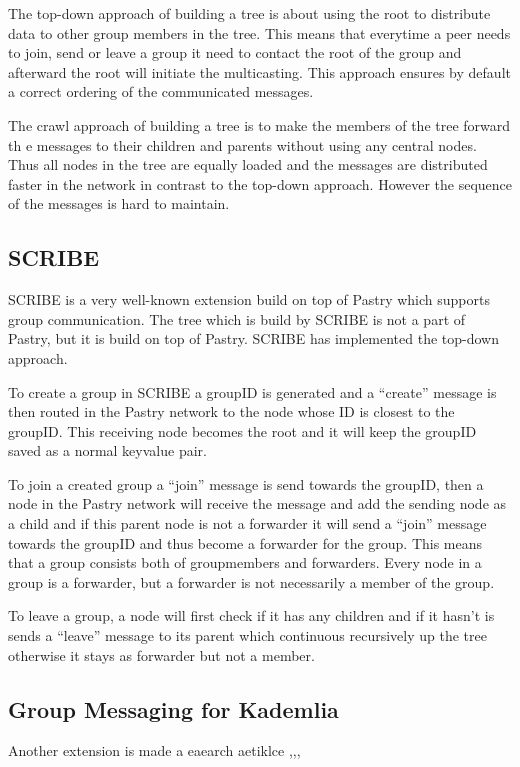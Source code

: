 The top-down approach of building a tree is about using the root to distribute data to other group members in the tree. This means that everytime a peer needs to join, send or leave a group it need to contact the root of the group and afterward the root will initiate the multicasting. This approach ensures by default a correct ordering of the communicated messages. 

The crawl approach of building a tree is to make the members of the tree forward th e messages to their children and parents without using any central nodes. Thus all nodes in the tree are equally loaded and the messages are distributed faster in the network in contrast to the top-down approach. However the sequence of the messages is hard to maintain. 

\subsection{SCRIBE}
SCRIBE is a very well-known extension build on top of Pastry which supports group communication. 
The tree which is build by SCRIBE is not a part of Pastry, but it is build on top of Pastry. SCRIBE has implemented the top-down approach. 

To create a group in SCRIBE a groupID is generated and a ``create'' message is then routed in the Pastry network to the node whose ID is closest to the groupID. This receiving node becomes the root and it will keep the groupID saved as a normal keyvalue pair.

To join a created group a ``join'' message is send towards the groupID, then a node in the Pastry network will receive the message and add the sending node as a child and if this parent node is not a forwarder it will send a ``join'' message towards the groupID and thus become a forwarder for the group. This means that a group consists both of groupmembers and forwarders. Every node in a group is a forwarder, but a forwarder is not necessarily a member of  the group. 

To leave a group, a node will first check if it has any children and if it hasn't is sends a ``leave'' message to its parent which continuous recursively up the tree otherwise it stays as forwarder but not a member.

 
\subsection{Group Messaging for Kademlia}
Another extension is made a eaearch aetiklce ,,,

